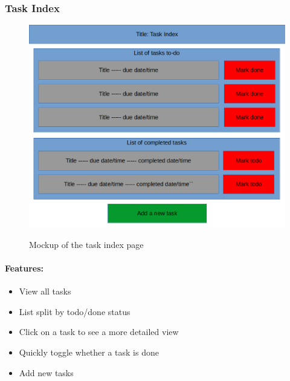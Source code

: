 \documentclass{article}
\begin{document}
\subsubsection{Task Index}
\begin{minipage}{0.5\textwidth}
\begin{figure}[H]
\includegraphics[width=\linewidth]{Mockups/task_index.png}
\label{fig:task_index_mockup}
\caption{Mockup of the task index page}
\end{figure}
\end{minipage} \hfill
\begin{minipage}{0.45\textwidth}
\paragraph{Features:}
\begin{itemize}
\item View all tasks
\item List split by todo/done status
\item Click on a task to see a more detailed view
\item Quickly toggle whether a task is done
\item Add new tasks
\end{itemize}
\end{minipage}
\end{document}
